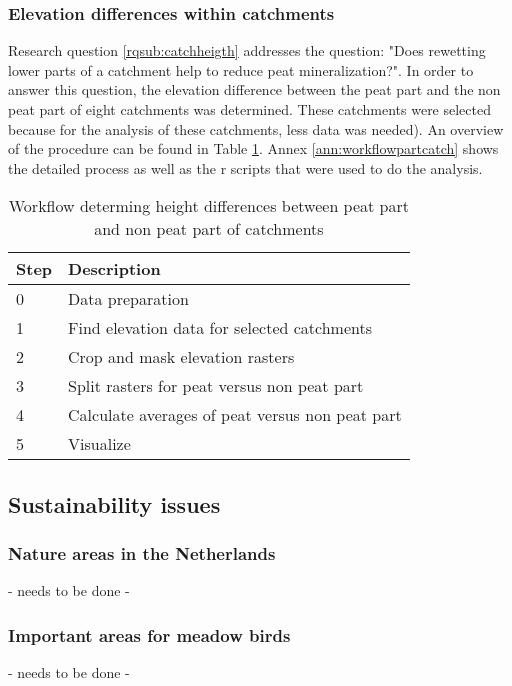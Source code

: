 \documentclass[a4paper,12pt]{scrbook}
\begin{document}
\subsubsection{Elevation differences within catchments}
Research question \ref{rqsub:catchheigth} addresses the question: "Does rewetting lower parts of a catchment help to reduce peat mineralization?". In order to answer this question, the elevation difference between the peat part and the non peat part of eight catchments was determined. These catchments were selected because for the analysis of these catchments, less data was needed). An overview of the procedure can be found in Table \ref{tab:workflowpartcatch}. Annex \ref{ann:workflowpartcatch} shows the detailed process as well as the r scripts that were used to do the analysis.

\begin{table}[htbp]
\caption{Workflow determing height differences between peat part and non peat part of catchments}
\begin{center}
\begin{tabular}{|p{3cm}|p{7cm}|}
\hline
\multicolumn{1}{|l|}{\textbf{Step}} & \textbf{Description} \\ \hline
0 & Data preparation \\ \hline
1 & Find elevation data for selected catchments \\ \hline
2 & Crop and mask elevation rasters \\ \hline
3 & Split rasters for peat versus non peat part \\ \hline
4 & Calculate averages of peat versus non peat part \\ \hline
5 & Visualize \\ \hline
\end{tabular}
\end{center}
\label{tab:workflowpartcatch}
\end{table}


\subsection{Sustainability issues}

\subsubsection{Nature areas in the Netherlands}
- needs to be done -

\subsubsection{Important areas for meadow birds}
- needs to be done -
\end{document}
